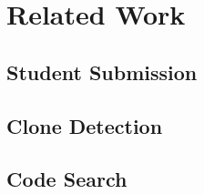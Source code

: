 
\section{Related Work}
\subsection{Student Submission}
\subsection{Clone Detection}
\subsection{Code Search}